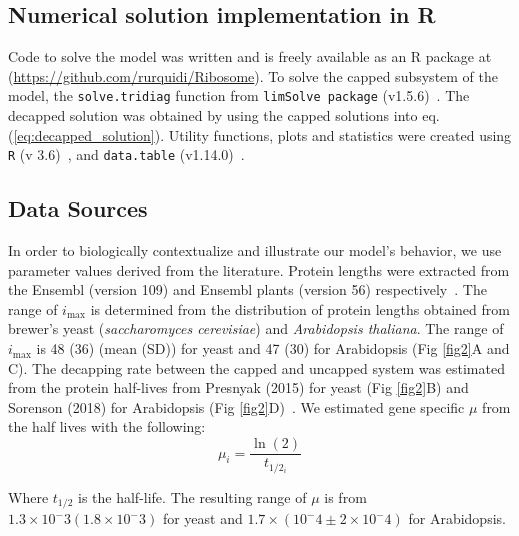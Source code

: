 \documentclass[10pt,letterpaper]{article}
\newcommand{\imax}{\ensuremath{{i_{\max}}}\xspace}
\begin{document}
\subsection*{Numerical solution implementation in R}
Code to solve the model was written and is freely available as an R package at (\url{https://github.com/rurquidi/Ribosome}). To solve the capped subsystem of the model, the \texttt{solve.tridiag} function from \texttt{limSolve package} (v1.5.6)~\cite{RN41}. The decapped solution was obtained by using the capped solutions into eq. (\ref{eq:decapped_solution}). Utility functions, plots and statistics were created using  \texttt{R} (v 3.6)~\cite{RN43}, and  \texttt{data.table} (v1.14.0)~\cite{RN42}. 
		
\subsection*{Data Sources}

In order to biologically contextualize and illustrate our model's behavior, we use parameter values derived from the literature.
Protein lengths were extracted from the Ensembl (version 109) and Ensembl plants (version 56) respectively~\cite{RN26,RN25,RN24}.  
The range of \imax is determined from the distribution of protein lengths obtained from brewer's yeast (\textit{saccharomyces cerevisiae}) and \textit{Arabidopsis thaliana}. The range of \imax is  48 (36) (mean (SD)) for yeast and 47 (30) for Arabidopsis (Fig \ref{fig2}A and C).
The decapping rate between the capped and uncapped system was estimated from the protein half-lives from Presnyak (2015) for yeast (Fig \ref{fig2}B) and Sorenson (2018) for Arabidopsis (Fig \ref{fig2}D)~\cite{RN27,RN28}.
We estimated gene specific $\mu$ from the half lives with the following:
	\begin{equation*}
		\mu_i = \frac{\ln(2)}{t_{1/2_i}}
	\end{equation*}

Where $t_{1/2}$ is the half-life. The resulting range of $\mu$ is from $1.3 \times 10^-3 (1.8 \times 10^-3)$ for yeast and $1.7 \times (10^-4 \pm 2 \times 10^-4)$ for Arabidopsis. 
\end{document}
